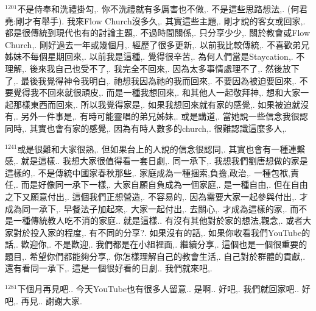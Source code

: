 \documentclass{book}
\begin{document}
$^{1201}$不是侍奉和洗禮掛勾,.
你不洗禮就有多厲害也不做,.
不是這些思路想法,.
(何君堯:剛才有舉手).
我來Flow Church沒多久,.
其實這些主題,.
剛才說的客女或回家,.
都是很傳統到現代也有的討論主題,.
不過時間關係,.
只分享少少,.
關於教會或Flow Church,.
剛好過去一年或幾個月,.
經歷了很多更新,.
以前我比較傳統,.
不喜歡弟兄姊妹不每個星期回來,.
以前我是這種,.
覺得很辛苦,.
為何人們當是Staycation,.
不理解,.
後來我自己也受不了,.
我完全不回來,.
因為太多事情處理不了,.
然後放下了,.
最後我覺得神令我明白,.
祂想我因為祂的我而回來,.
不要因為被迫要回來,.
不要覺得我不回來就很頑皮,.
而是一種我想回來,.
和其他人一起敬拜神,.
想和大家一起那樣東西而回來,.
所以我覺得家是,.
如果我想回來就有家的感覺,.
如果被迫就沒有,.
另外一件事是,.
有時可能靈唱的弟兄姊妹,.
或是講道,.
當她說一些信念我很認同時,.
其實也會有家的感覺,.
因為有時人數多的church,.
很難認識這麼多人,.

$^{1241}$或是很難和大家很熟,.
但如果台上的人說的信念很認同,.
其實也會有一種連繫感,.
就是這樣..
我想大家很值得看一套日劇,.
同一承下,.
我想我們劉唐想做的家是這樣的,.
不是傳統中國家春秋那些,.
家庭成為一種捆索,負擔,政治,.
一種包袱,責任,.
而是好像同一承下一樣,.
大家自願自負成為一個家庭,.
是一種自由,.
但在自由之下又願意付出,.
這個我們正想營造,.
不容易的,.
因為需要大家一起參與付出,.
才成為同一承下,.
早餐法子加起來,.
大家一起付出,.
去關心,.
才成為這樣的家,.
而不是一種傳統教人吃不消的家庭..
就是這樣..
有沒有其他對於家的想法,觀念,.
或者大家對於投入家的程度,.
有不同的分享?.
如果沒有的話,.
如果你收看我們YouTube的話,.
歡迎你,.
不是歡迎,.
我們都是在小組裡面,.
繼續分享,.
這個也是一個很重要的題目,.
希望你們都能夠分享,.
你怎樣理解自己的教會生活,.
自己對於群體的貢獻,.
還有看同一承下,.
這是一個很好看的日劇..
我們就來吧,.

$^{1281}$下個月再見吧..
今天YouTube也有很多人留意..
是啊..
好吧,.
我們就回家吧..
好吧,.
再見..
謝謝大家.
\newpage
\end{document}
